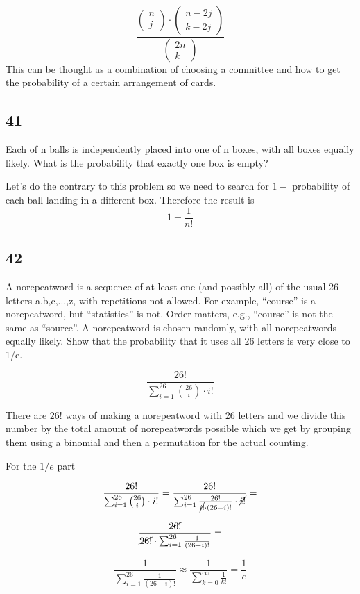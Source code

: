 \documentclass{article}
\begin{document}
$$ \frac {\begin{pmatrix}
n\\
j
\end{pmatrix} \cdot \begin{pmatrix}
n-2j\\
k-2j
\end{pmatrix} } {\begin{pmatrix}
2n\\
k
\end{pmatrix}}$$ This can  be thought as a combination of choosing a committee and how to get the probability of a certain arrangement of cards.

\subsection{41}
Each of n balls is independently placed into one of n boxes, with all boxes equally likely. What is the probability that exactly one box is empty?

Let's do the contrary to this problem so we need to search for $1-$ probability of each ball landing in a different box. Therefore the result is $$1 - \frac{1}{n!}$$
\newpage
\subsection{42}
A norepeatword is a sequence of at least one (and possibly all) of the usual 26 letters a,b,c,...,z, with repetitions not allowed. For example, “course” is a norepeatword, but “statistics” is not. Order matters, e.g., “course” is not the same as “source”. A norepeatword is chosen randomly, with all norepeatwords equally likely. Show that the probability that it uses all 26 letters is very close to 1/e.

$$\frac{26!}{\sum_{i=1}^{26} \binom{26}{i} \cdot i!}$$

There are $26!$ ways of making a norepeatword with 26 letters and we divide this number by the total amount of norepeatwords possible which we get by grouping them using a binomial and then a permutation for the actual counting.

For the $1/e$ part

$$\frac{26!}{\sum_{i=1}^{26} \binom{26}{i} \cdot i!}= \frac{26!}{\sum_{i=1}^{26} \frac{26!}{\cancel{i!} \cdot (26-i)!} \cdot \cancel{i!}}=$$

$$\frac{\cancel{26!}}{ \cancel{26!} \cdot \sum_{i=1}^{26} \frac{1}{ (26-i)!} }=$$

$$\frac{1}{\sum_{i=1}^{26} \frac{1}{ (26-i)!}} \approx 
 \frac{1}{ \sum_{k=0}^\infty \frac{1}{k!}} = \frac{1}{e}$$
\end{document}
